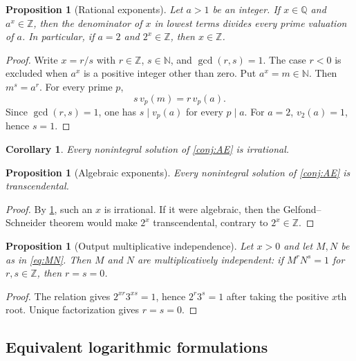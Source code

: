 \documentclass[11pt,oneside]{article}
\newtheorem{proposition}[theorem]{Proposition}
\newtheorem{corollary}[theorem]{Corollary}
\theoremstyle{definition}
\theoremstyle{remark}
\newcommand{\Z}{\mathbb Z}
\newcommand{\N}{\mathbb N}
\newcommand{\Q}{\mathbb Q}
\begin{document}
\begin{proposition}[Rational exponents]
\label{prop:rational}
Let $a>1$ be an integer.  If $x\in\Q$ and $a^x\in\Z$, then the denominator of
$x$ in lowest terms divides every prime valuation of $a$.  In particular, if
$a=2$ and $2^x\in\Z$, then $x\in\Z$.
\end{proposition}

\begin{proof}
Write $x=r/s$ with $r\in\Z$, $s\in\N$, and $\gcd(r,s)=1$.  The case $r<0$ is
excluded when $a^x$ is a positive integer other than zero.  Put $a^x=m\in\N$.
Then $m^s=a^r$.  For every prime $p$,
\[
  s\,v_p(m)=r\,v_p(a).
\]
Since $\gcd(r,s)=1$, one has $s\mid v_p(a)$ for every $p\mid a$.  For $a=2$,
$v_2(a)=1$, hence $s=1$.
\end{proof}

\begin{corollary}
\label{cor:irrational}
Every nonintegral solution of \cref{conj:AE} is irrational.
\end{corollary}

\begin{proposition}[Algebraic exponents]
\label{prop:transcendental}
Every nonintegral solution of \cref{conj:AE} is transcendental.
\end{proposition}

\begin{proof}
By \cref{cor:irrational}, such an $x$ is irrational.  If it were algebraic,
then the Gelfond--Schneider theorem would make $2^x$ transcendental, contrary
to $2^x\in\Z$.
\end{proof}

\begin{proposition}[Output multiplicative independence]
\label{prop:independent}
Let $x>0$ and let $M,N$ be as in \eqref{eq:MN}.  Then $M$ and $N$ are
multiplicatively independent: if $M^rN^s=1$ for $r,s\in\Z$, then $r=s=0$.
\end{proposition}

\begin{proof}
The relation gives $2^{xr}3^{xs}=1$, hence $2^r3^s=1$ after taking the
positive $x$th root.  Unique factorization gives $r=s=0$.
\end{proof}

\subsection{Equivalent logarithmic formulations}
\end{document}
